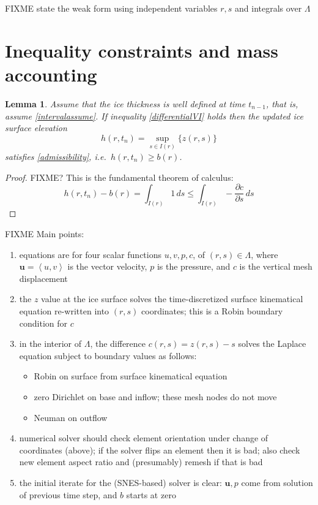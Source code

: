 \documentclass[letterpaper,final,12pt,reqno]{amsart}
\newcommand{\bu}{\mathbf{u}}
\newtheorem{lemma}{Lemma}
\begin{document}
FIXME state the weak form using independent variables $r,s$ and integrals over $\Lambda$


\section{Inequality constraints and mass accounting}

\begin{lemma}
Assume that the ice thickness is well defined at time $t_{n-1}$, that is, assume
\eqref{intervalassume}.  If inequality \eqref{differentialVI} holds then the updated ice surface elevation
    $$h(r,t_n) = \sup_{s\in I(r)}\{z(r,s)\}$$
satisfies \eqref{admissibility}, i.e.~$h(r,t_n)\ge b(r)$.
\end{lemma}

\begin{proof}
FIXME? This is the fundamental theorem of calculus:
    $$h(r,t_n) - b(r) = \int_{I(r)} 1\,ds \le \int_{I(r)} - \frac{\partial c}{\partial s}\,ds$$
\end{proof}

FIXME Main points:
\renewcommand{\labelenumi}{\arabic{enumi}.}
\begin{enumerate}
\item equations are for four scalar functions $u,v,p,c$, of $(r,s) \in \Lambda$, where $\bu=\left<u,v\right>$ is the vector velocity, $p$ is the pressure, and $c$ is the vertical mesh displacement
\item the $z$ value at the ice surface solves the time-discretized surface kinematical equation re-written into $(r,s)$ coordinates; this is a Robin boundary condition for $c$
\item in the interior of $\Lambda$, the difference $c(r,s)=z(r,s)-s$ solves the Laplace equation subject to boundary values as follows:
    \begin{itemize}
    \item Robin on surface from surface kinematical equation
    \item zero Dirichlet on base and inflow; these mesh nodes do not move
    \item Neuman on outflow
    \end{itemize}
\item numerical solver should check element orientation under change of coordinates (above); if the solver flips an element then it is bad; also check new element aspect ratio and (presumably) remesh if that is bad
\item the initial iterate for the (SNES-based) solver is clear: $\bu,p$ come from solution of previous time step, and $b$ starts at zero
\end{enumerate}



\small

\bigskip


\end{document}
